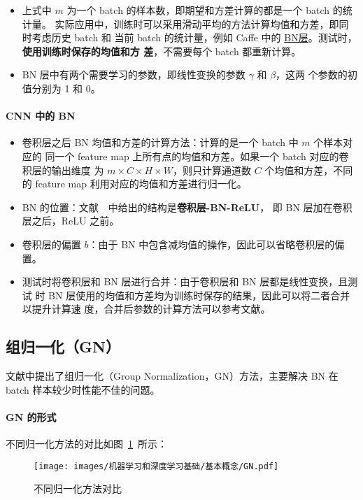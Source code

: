 \begin{itemize}
\item 上式中 $m$ 为一个 batch 的样本数，即期望和方差计算的都是一个 batch 的统计量。
  实际应用中，训练时可以采用滑动平均的方法计算均值和方差，即同时考虑历史 batch 和
  当前 batch 的统计量，例如 Caffe 中的
  \href{https://bit.ly/2JBY7aw}{BN层}。测试时，\textbf{使用训练时保存的均值和方
    差}，不需要每个 batch 都重新计算。
  \item BN 层中有两个需要学习的参数，即线性变换的参数 $\gamma$ 和 $\beta$，这两
    个参数的初值分别为 1 和 0。
\end{itemize}

\paragraph{CNN 中的 BN}
\begin{itemize}
  \item 卷积层之后 BN 均值和方差的计算方法：计算的是一个 batch 中 $m$ 个样本对应的
    同一个 feature map 上所有点的均值和方差。如果一个 batch 对应的卷积层的输出维度
    为 $m \times C \times H \times W$，则只计算通道数 $C$ 个均值和方差，不同
    的 feature map 利用对应的均值和方差进行归一化。
  \item BN 的位置：文献~~中给出的结构是\textbf{卷积层-BN-ReLU}，
    即 BN 层加在卷积层之后，ReLU 之前。
  \item 卷积层的偏置 $b$：由于 BN 中包含减均值的操作，因此可以省略卷积层的偏置。
  \item 测试时将卷积层和 BN 层进行合并：由于卷积层和 BN 层都是线性变换，且测试
    时 BN 层使用的均值和方差均为训练时保存的结果，因此可以将二者合并以提升计算速
    度，合并后参数的计算方法可以参考文献。
\end{itemize}

\subsection{组归一化（GN）}
\label{sub:GN}

文献中提出了组归一化（Group Normalization，GN）方法，主要解决 BN
在 batch 样本较少时性能不佳的问题。

\paragraph{GN 的形式}
不同归一化方法的对比如图~\ref{fig:all-norm}~所示：
\begin{figure}[ht]
  \centering
  \texttt{[image: images/机器学习和深度学习基础/基本概念/GN.pdf]}
  \caption{不同归一化方法对比}
  \label{fig:all-norm}
\end{figure}

